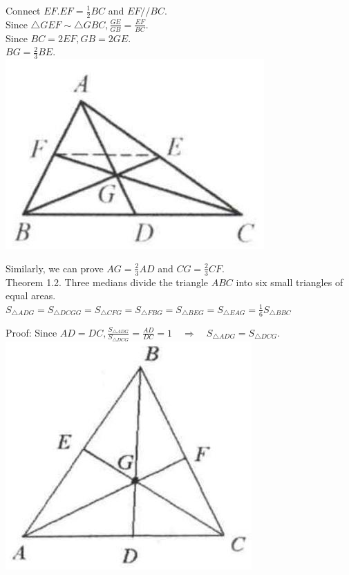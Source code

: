 \documentclass[10pt]{article}
\begin{document}
Connect \(E F . E F=\frac{1}{2} B C\) and \(E F / / B C\).\\
Since \(\triangle G E F \sim \triangle G B C, \frac{G E}{G B}=\frac{E F}{B C}\).\\
Since \(B C=2 E F, G B=2 G E\).\\
\(B G=\frac{2}{3} B E\).\\
\includegraphics[max width=\textwidth, center]{2025_04_17_97bc1f7e44d93c271a88g-007}


Similarly, we can prove \(A G=\frac{2}{3} A D\) and \(C G=\frac{2}{3} C F\).\\
Theorem 1.2. Three medians divide the triangle \(A B C\) into six small triangles of equal areas.\\
\(S_{\triangle A D G}=S_{\triangle D C G G}=S_{\triangle C F G}=S_{\triangle F B G}=S_{\triangle B E G}=S_{\triangle E A G}=\frac{1}{6} S_{\triangle B B C}\)

Proof:
Since \(A D=D C, \frac{S_{\triangle A D G}}{S_{\triangle D C G}}=\frac{A D}{D C}=1 \quad \Rightarrow \quad S_{\triangle A D G}=S_{\triangle D C G}\).\\
\includegraphics[max width=\textwidth, center]{2025_04_17_97bc1f7e44d93c271a88g-008(1)}
\end{document}
